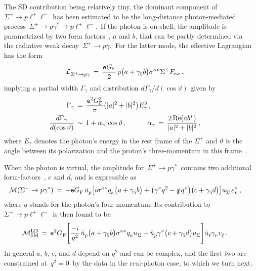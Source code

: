 \documentclass[amsmath,amssymb,aps,nofootinbib,prd,preprint,superscriptaddress,tightenlines,a4paper,bm]{revtex4-2}
\begin{document}
The SD contribution being relatively tiny, the dominant component of \,$\Sigma^+\to p\ell^+\ell^-$\, has been estimated to be the long-distance photon-mediated process \,$\Sigma^+\to p\gamma^*\to p\ell^+\ell^-$.\,
If the photon is on-shell, the amplitude is parametrized by two form factors~\cite{Behrends:1958zz}, $a$ and $b$, that can be partly determined via the radiative weak decay \,$\Sigma^+\to p\gamma$.\,
For the latter mode, the effective Lagrangian has the form
\begin{align} \label{radff}
{\cal L}_{\Sigma^+\to p\gamma}^{} & \,=\, \frac{{\tt e}G_{\rm F}}{2}\, \overline p \big( a +\gamma_5^{} b \big) \sigma^{\kappa\nu} \Sigma^+ F_{\kappa\nu} \,, &
\end{align}
implying a partial width $\Gamma_\gamma$ and distribution $d\Gamma_\gamma/d(\cos\vartheta)$ given by
\begin{align} \label{Ga}
\Gamma_\gamma & \,=\, \frac{{\tt e}^2 G_{\rm F}^2}{\pi} \big(|a|^2+|b|^2\big) E_\gamma^3 \,,
\nonumber \\
\frac{d\Gamma_\gamma}{d(\cos\vartheta)} & \,\sim\, 1+\alpha_\gamma\, \cos\vartheta \,, \hspace{3em} \alpha_\gamma \,=\, \frac{2\,{\rm Re} (ab^*)}{|a|^2+|b|^2} \,, &
\end{align}
where $E_\gamma$ denotes the photon's energy in the rest frame of the $\Sigma^+$ and $\vartheta$ is the angle between its polarization and the proton's three-momentum in this frame~\cite{Workman:2022ynf}.

When the photon is virtual, the amplitude for \,$\Sigma^+\to p\gamma^*$\, contains two additional form-factors~\cite{Lyagin:1962,Bergstrom:1987wr}, $c$ and $d$, and is expressible as
\begin{align} \label{M_BBg}
{\cal M}(\Sigma^+\to p\gamma^*) & \,=\,
- {\tt e}G_{\rm F}^{}\, \bar u_p^{} \big[ i\sigma^{\kappa\nu} q_\kappa^{} \big(a+\gamma_5^{}b\big) + \big( \gamma^\nu q^2 - \slashed q\, q^\nu \big) \big(c+\gamma_5^{}d\big) \big] u_\Sigma^{}\, \varepsilon_\nu^* \,, &
\end{align}
where $q$ stands for the photon's four-momentum.
Its contribution to \,$\Sigma^+\to p\ell^+\ell^-$\, is then found to be
\begin{align} \label{ffabcd}
{\cal M}_{\rm SM}^{\rm LD} & \,=\, {\tt e}^2 G_{\rm F}^{} \Bigg[ \frac{-i}{q^2}\, \bar u_p^{} \big(a+\gamma_5^{}b\big) \sigma^{\kappa\nu} q_\kappa^{} u_\Sigma^{} - \bar u_p^{} \gamma^\nu \big(c+\gamma_5^{}d\big) u_\Sigma^{} \Bigg] \bar u_\ell^{} \gamma_\nu^{} v_{\bar\ell}^{} \,. &
\end{align}
In general  $a$, $b$, $c$, and $d$ depend on $q^2$ and can be complex, and the first two are constrained at \,$q^2=0$\, by the data in the real-photon case, to which we turn next.
\end{document}
